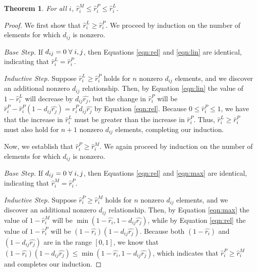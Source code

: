 \documentclass{article}
\newtheorem{thm}{Theorem}
\begin{document}
\begin{thm}
\label{thm:bounds}
For all $i$, $\hat{r}_i^M \leq \hat{r}_i^P \leq \hat{r}_i^L$. 
\end{thm}
\begin{proof}

We first show that $\hat{r}_i^L \geq \hat{r}_i^P$. We proceed by induction on the number of elements for which $d_{ij}$ is nonzero.

\emph{Base Step.} If $d_{ij}=0 \hspace{1mm} \forall \hspace{1mm} i,j$, then Equations \ref{eqn:rel} and \ref{eqn:lin} are identical, indicating that $\hat{r}_i^L = \hat{r}_i^P$. 

\emph{Inductive Step.} Suppose $\hat{r}_i^L \geq \hat{r}_i^P$ holds for $n$ nonzero $d_{ij}$ elements, and we discover an additional nonzero $d_{ij}$ relationship. Then, by Equation \ref{eqn:lin} the value of $1-\hat{r}_i^L$ will decrease by $d_{ij}\hat{r_j}$, but the change in $\hat{r}_i^P$ will be $\hat{r}_i^P - \hat{r}_i^P(1-d_{ij}\hat{r_j}) = \hat{r}_i^P d_{ij}\hat{r_j}$ by Equation \ref{eqn:rel}. Because $0 \leq \hat{r}_i^P \leq 1$, we have that the increase in $\hat{r}_i^L$ must be greater than the increase in $\hat{r}_i^P$. Thus, $\hat{r}_i^L \geq \hat{r}_i^P$ must also hold for $n+1$ nonzero $d_{ij}$ elements, completing our induction.

Now, we establish that $\hat{r}_i^P \geq \hat{r}_i^M$. We again proceed by induction on the number of elements for which $d_{ij}$ is nonzero.

\emph{Base Step.} If $d_{ij}=0 \hspace{1mm} \forall \hspace{1mm} i,j$, then Equations \ref{eqn:rel} and \ref{eqn:max} are identical, indicating that $\hat{r}_i^M = \hat{r}_i^P$. 

\emph{Inductive Step.} Suppose $\hat{r}_i^P \geq \hat{r}_i^M$ holds for $n$ nonzero $d_{ij}$ elements, and we discover an additional nonzero $d_{ij}$ relationship. Then, by Equation \ref{eqn:max} the value of $1-\hat{r}_i^M$ will be $\min\left(1-\hat{r_i}, 1-d_{ij}\hat{r_j}\right)$, while by Equation \ref{eqn:rel} the value of $1-\hat{r}_i^P$ will be $(1-\hat{r_i})(1-d_{ij}\hat{r_j})$. Because both $(1-\hat{r_i})$ and $(1-d_{ij}\hat{r_j})$ are in the range $[0,1]$, we know that $(1-\hat{r_i})(1-d_{ij}\hat{r_j}) \leq \min\left(1-\hat{r_i}, 1-d_{ij}\hat{r_j}\right)$, which indicates that $\hat{r}_i^P \geq \hat{r}_i^M$ and completes our induction.
\end{proof}
\end{document}
